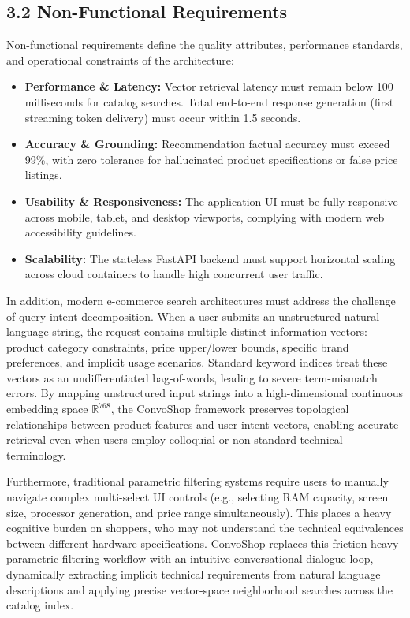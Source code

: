 \documentclass[12pt,a4paper]{article}
\begin{document}
\subsection*{3.2 Non-Functional Requirements}
\label{sec:3.2}
Non-functional requirements define the quality attributes, performance standards, and operational constraints of the architecture:
\begin{itemize}
    \item \textbf{Performance \& Latency:} Vector retrieval latency must remain below 100 milliseconds for catalog searches. Total end-to-end response generation (first streaming token delivery) must occur within 1.5 seconds.
    \item \textbf{Accuracy \& Grounding:} Recommendation factual accuracy must exceed 99\%, with zero tolerance for hallucinated product specifications or false price listings.
    \item \textbf{Usability \& Responsiveness:} The application UI must be fully responsive across mobile, tablet, and desktop viewports, complying with modern web accessibility guidelines.
    \item \textbf{Scalability:} The stateless FastAPI backend must support horizontal scaling across cloud containers to handle high concurrent user traffic.
\end{itemize}



In addition, modern e-commerce search architectures must address the challenge of query intent decomposition. When a user submits an unstructured natural language string, the request contains multiple distinct information vectors: product category constraints, price upper/lower bounds, specific brand preferences, and implicit usage scenarios. Standard keyword indices treat these vectors as an undifferentiated bag-of-words, leading to severe term-mismatch errors. By mapping unstructured input strings into a high-dimensional continuous embedding space $\mathbb{R}^{768}$, the ConvoShop framework preserves topological relationships between product features and user intent vectors, enabling accurate retrieval even when users employ colloquial or non-standard technical terminology.

Furthermore, traditional parametric filtering systems require users to manually navigate complex multi-select UI controls (e.g., selecting RAM capacity, screen size, processor generation, and price range simultaneously). This places a heavy cognitive burden on shoppers, who may not understand the technical equivalences between different hardware specifications. ConvoShop replaces this friction-heavy parametric filtering workflow with an intuitive conversational dialogue loop, dynamically extracting implicit technical requirements from natural language descriptions and applying precise vector-space neighborhood searches across the catalog index.
\end{document}
